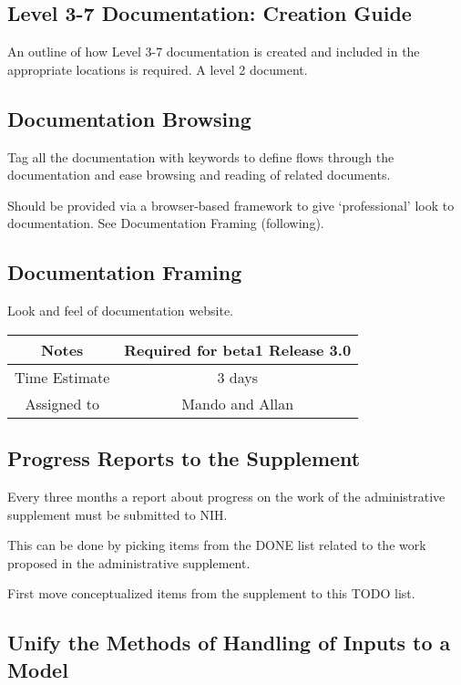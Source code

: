 \documentclass[12pt]{article}
\begin{document}
\subsection{Level 3-7 Documentation: Creation Guide}

An outline of how Level 3-7 documentation is created and included in
the appropriate locations is required.  A level 2 document.


\subsection{Documentation Browsing}

Tag all the documentation with keywords to define flows through the
documentation and ease browsing and reading of related documents.

Should be provided via a browser-based framework to give
`professional' look to documentation. See Documentation Framing
(following).


\subsection{Documentation Framing}

Look and feel of documentation website.

{
  \vspace{5mm}
  \centering
  \begin{tabular}{|c|c|}
    \hline
    Notes
    & Required for beta1 Release 3.0 \\
    \hline
    Time Estimate
    & 3 days \\
    \hline
    Assigned to
    & Mando and Allan \\
    \hline
  \end{tabular}
}



\subsection{Progress Reports to the Supplement}

Every three months a report about progress on the work of the
administrative supplement must be submitted to NIH.

This can be done by picking items from the DONE list related to the
work proposed in the administrative supplement.

First move conceptualized items from the supplement to this TODO list.


\subsection{Unify the Methods of Handling of Inputs to a Model}
\end{document}
